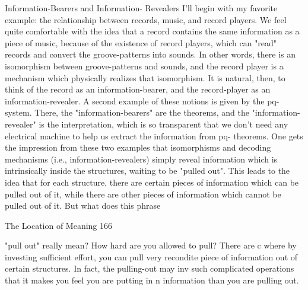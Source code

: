 Information-Bearers and Information- Revealers
I'll begin with my favorite example: the relationship between records, music, and record
players. We feel quite comfortable with the idea that a record contains the same
information as a piece of music, because of the existence of record players, which can
"read" records and convert the groove-patterns into sounds. In other words, there is an
isomorphism between groove-patterns and sounds, and the record player is a mechanism
which physically realizes that isomorphism. It is natural, then, to think of the record as an
information-bearer, and the record-player as an information-revealer. A second example
of these notions is given by the pq-system. There, the "information-bearers" are the
theorems, and the "information-revealer" is the interpretation, which is so transparent that
we don't need any electrical machine to help us extract the information from pq-
theorems.
         One gets the impression from these two examples that isomorphisms and
decoding mechanisms (i.e., information-revealers) simply reveal information which is
intrinsically inside the structures, waiting to be "pulled out". This leads to the idea that
for each structure, there are certain pieces of information which can be pulled out of it,
while there are other pieces of information which cannot be pulled out of it. But what
does this phrase




The Location of Meaning                                                                  166

"pull out" really mean? How hard are you allowed to pull? There are c where by
investing sufficient effort, you can pull very recondite piece of information out of certain
structures. In fact, the pulling-out may inv such complicated operations that it makes you
feel you are putting in n information than you are pulling out.


